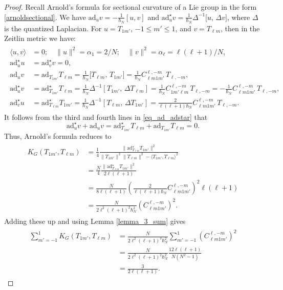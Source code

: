 \documentclass[11pt]{amsart}
\numberwithin{equation}{section}
\theoremstyle{definition}
\newcommand{\ad}{\mathrm{ad}}
\newcommand{\adstar}{\ad^{\star}}
\begin{document}
\begin{proof}
Recall Arnold's formula for sectional curvature of a Lie group in the form
\eqref{arnoldsectional}. 
We have $\mathrm{ad}_uv = -\tfrac{1}{\hbar_N}[u, v]$ and $\adstar_uv = \tfrac{1}{\hbar_N}\Delta^{-1}\big[u,\,\Delta v\big]$, where $\Delta$ is the quantized Laplacian. For $u = T_{1m'}$, $-1 \leq m' \leq 1$, and $v = T_{\ell m}$, then in the Zeitlin metric we have:
\begin{gather}\label{eq_ad_adstar}
\begin{split}
 \langle u, v \rangle &= 0; \quad \|u\|^2 = \alpha_1 = 2/N; \quad \|v\|^2 = \alpha_{\ell} = \ell(\ell+1)/N, \\
\adstar_uu &= \adstar_vv = 0, \\ 
\mathrm{ad}_uv &= \mathrm{ad}_{T_{1m'}}T_{\ell m} = \tfrac{1}{\hbar_N}\big[T_{\ell m}, \, T_{1m'}\big] = \tfrac{1}{\hbar_N} C_{\ell m 1 m'}^{\ell, -m}\, T_{\ell, -m}, \\
\adstar_uv &= \adstar_{T_{1m'}}T_{\ell m} = \tfrac{1}{\hbar_N}\Delta^{-1}[T_{1m'},\, \Delta T_{\ell m}] = \tfrac{1}{\hbar_N}C_{1 m' \ell m}^{\ell, -m} \, T_{\ell, -m} = -\tfrac{1}{\hbar_N}C_{\ell m 1 m'}^{\ell, -m}\, T_{\ell, -m}, \\
\adstar_vu &= \adstar_{T_{\ell m}}T_{1m'} = \tfrac{1}{\hbar_N}\Delta^{-1}[T_{\ell m},\, \Delta T_{1m'}] = \frac{2}{\ell(\ell+1)\hbar_N} C_{\ell m 1 m'}^{\ell, -m} \, T_{\ell, -m}.
\end{split}
\end{gather}
It follows from the third and fourth lines in \eqref{eq_ad_adstar} that
\begin{equation*}
\adstar_uv + \mathrm{ad}_uv = \adstar_{T_{1m'}}T_{\ell m} + \mathrm{ad}_{T_{1m'}}T_{\ell m} = 0.
\end{equation*}
Thus, Arnold's formula reduces to
\begin{gather}
\begin{split}
K_G(T_{1m'},T_{\ell m}) &= \frac{1}{4} \frac{\| \adstar_{T_{\ell m}}T_{1m'} \|^2}{\| T_{1m'}\|^2 \| {T_{\ell m}}\|^2-\langle T_{1m'},{T_{\ell m}}\rangle^2} \\ 
&= \frac{N}{4}\frac{\| \adstar_{T_{\ell m}}T_{1m'} \|^2}{2\ell(\ell+1)} \\ 
&= \frac{N}{8\ell(\ell+1)}\left(
\frac{2}{\ell(\ell+1)\hbar_N} C_{\ell m 1 m'}^{\ell, -m}\right)^2 \ell(\ell+1) \\
&= \frac{N}{2\ell^2(\ell+1)^2\hbar_N^2} \left(C_{\ell m 1 m'}^{\ell, -m}\right)^2.
\end{split}
\end{gather}
Adding these up and using Lemma \ref{lemma_3_sum} gives
\begin{gather*}
\begin{split}
\sum\limits_{m' = -1}^1 K_G(T_{1m'}, T_{\ell m})
&= \frac{N}{2\ell^2(\ell+1)^2\hbar_N^2}
\sum\limits_{m' = -1}^1
\left(C_{\ell m 1 m'}^{\ell, -m}\right)^2 \\
&=
\frac{N}{2\ell^2(\ell+1)^2\hbar_N^2}\frac{12\ell(\ell+1)}{N(N^2-1)} \\
&= \frac{3}{2\ell(\ell+1)}.
\end{split}
\end{gather*}
\end{proof}
\end{document}

